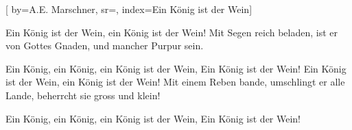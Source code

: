 

[ 		%
	by={A.E. Marschner},					%
	sr={},					%
	index={Ein König ist der Wein}]						%
	

\beginverse*						%
Ein König ist der Wein, ein König ist der Wein!
Mit Segen reich beladen, ist er von Gottes Gnaden, 
und mancher Purpur sein.
\endverse							%

\beginverse*						%
Ein König, ein König, ein König ist der Wein,
Ein König ist der Wein!
\endverse
\beginverse*
Ein König ist der Wein, ein König ist der Wein!
Mit einem Reben bande, umschlingt er alle Lande, 
beherrcht sie gross und klein!
\endverse

\beginverse*
Ein König, ein König, ein König ist der Wein,
Ein König ist der Wein!
\endverse

\vspace{5mm}
\endsong							%